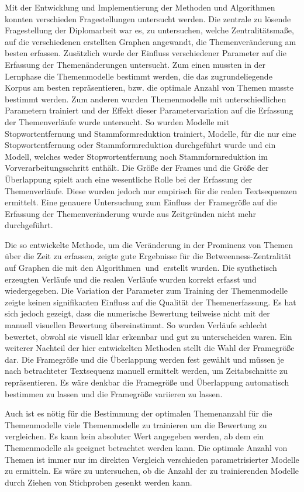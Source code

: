 Mit der Entwicklung und Implementierung der Methoden und Algorithmen konnten verschieden Fragestellungen untersucht werden. Die zentrale zu lösende Fragestellung der Diplomarbeit war es, zu untersuchen, welche Zentralitätsmaße, auf die verschiedenen erstellten Graphen angewandt, die Themenveränderung am besten erfassen. Zusätzlich wurde der Einfluss verschiedener Parameter auf die Erfassung der Themenänderungen untersucht. Zum einen mussten in der Lernphase die Themenmodelle bestimmt werden, die das zugrundeliegende Korpus am besten repräsentieren, bzw. die optimale Anzahl von Themen musste bestimmt werden. Zum anderen wurden Themenmodelle mit unterschiedlichen Parametern trainiert und der Effekt dieser Parametervariation auf die Erfassung der Themenverläufe wurde untersucht. So wurden Modelle mit Stopwortentfernung und Stammformreduktion trainiert, Modelle, für die nur eine Stopwortentfernung oder Stammformreduktion durchgeführt wurde und ein Modell, welches weder Stopwortentfernung noch Stammformreduktion im Vorverarbeitungsschritt enthält. Die Größe der Frames und die Größe der Überlappung spielt auch eine wesentliche Rolle bei der Erfassung der Themenverläufe. Diese wurden jedoch nur empirisch für die realen Textsequenzen ermittelt. Eine genauere Untersuchung zum Einfluss der Framegröße auf die Erfassung der Themenveränderung wurde aus Zeitgründen nicht mehr durchgeführt.

Die so entwickelte Methode, um die Veränderung in der Prominenz von Themen über die Zeit zu erfassen, zeigte gute Ergebnisse   
für die Betweenness-Zentralität auf Graphen die mit den Algorithmen \CDC$\:$und \TPR$\:$erstellt wurden. Die synthetisch erzeugten Verläufe und die realen Verläufe wurden korrekt erfasst und wiedergegeben. Die Variation der Parameter zum Training der Themenmodelle zeigte keinen signifikanten Einfluss auf die Qualität der Themenerfassung. Es hat sich jedoch gezeigt, dass die numerische Bewertung teilweise nicht mit der manuell visuellen Bewertung übereinstimmt. So wurden Verläufe schlecht bewertet, obwohl sie visuell klar erkennbar und gut zu unterscheiden waren. Ein weiterer Nachteil der hier entwickelten Methoden stellt die Wahl der Framegröße dar. Die Framegröße und die Überlappung werden fest gewählt und müssen je nach betrachteter Textsequenz manuell ermittelt werden, um Zeitabschnitte zu repräsentieren. Es wäre denkbar die Framegröße und Überlappung automatisch bestimmen zu lassen und die Framegröße variieren zu lassen. 

Auch ist es nötig für die Bestimmung der optimalen Themenanzahl für die Themenmodelle viele Themenmodelle zu trainieren um die Bewertung zu vergleichen. Es kann kein absoluter Wert angegeben werden, ab dem ein Themenmodelle als geeignet betrachtet werden kann. Die optimale Anzahl von Themen ist immer nur im direkten Vergleich verschieden parametrisierter Modelle zu ermitteln. Es wäre zu untersuchen, ob die Anzahl der zu trainierenden Modelle durch Ziehen von Stichproben gesenkt werden kann. 

